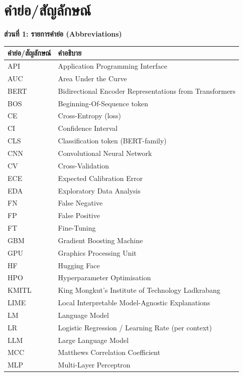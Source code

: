 \chapter*{คำย่อ/สัญลักษณ์}

\noindent\textbf{ส่วนที่ 1: รายการคำย่อ (Abbreviations)}

\begin{longtable}{p{3cm}p{10.5cm}}
\toprule
\textbf{คำย่อ/สัญลักษณ์} & \textbf{คำอธิบาย} \\
\midrule
\endhead
API     & Application Programming Interface \\
AUC     & Area Under the Curve \\
BERT    & Bidirectional Encoder Representations from Transformers \\
BOS     & Beginning-Of-Sequence token \\
CE      & Cross-Entropy (loss) \\
CI      & Confidence Interval \\
CLS     & Classification token (BERT-family) \\
CNN     & Convolutional Neural Network \\
CV      & Cross-Validation \\
ECE     & Expected Calibration Error \\
EDA     & Exploratory Data Analysis \\
FN      & False Negative \\
FP      & False Positive \\
FT      & Fine-Tuning \\
GBM     & Gradient Boosting Machine \\
GPU     & Graphics Processing Unit \\
HF      & Hugging Face \\
HPO     & Hyperparameter Optimisation \\
KMITL   & King Mongkut's Institute of Technology Ladkrabang \\
LIME    & Local Interpretable Model-Agnostic Explanations \\
LM      & Language Model \\
LR      & Logistic Regression / Learning Rate (per context) \\
LLM     & Large Language Model \\
MCC     & Matthews Correlation Coefficient \\
MLP     & Multi-Layer Perceptron \\

\end{longtable}
